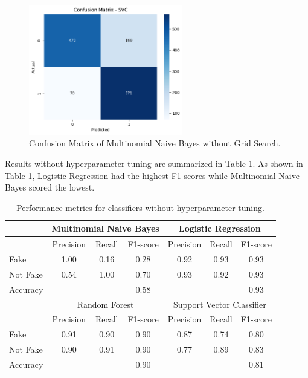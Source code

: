 \begin{figure}[h!]
    \centering
    \includegraphics[width=0.6\textwidth,height=0.6\textheight, keepaspectratio]{figures/hyperparam/SVC_default.png}
        \caption{Confusion Matrix of Multinomial Naive Bayes without Grid Search.}
        \label{SVC_default}
\end{figure}

Results without hyperparameter tuning are summarized in Table \ref{tab:no_hyperparam_summary}. As shown in Table \ref{tab:no_hyperparam_summary}, Logistic Regression had the highest F1-scores while Multinomial Naive Bayes scored the lowest.

\begin{table}[ht]
    \centering
    \begin{tabular}{|l|ccc|ccc|}
    \hline
    & \multicolumn{3}{c|}{Multinomial Naive Bayes} & \multicolumn{3}{c|}{Logistic Regression} \\
    \hline
    & Precision & Recall & F1-score & Precision & Recall & F1-score \\
    \hline
    Fake & 1.00 & 0.16 & 0.28 & 0.92 & 0.93 & 0.93 \\
    Not Fake & 0.54 & 1.00 & 0.70 & 0.93 & 0.92 & 0.93 \\
    Accuracy & & & 0.58 & & & 0.93 \\
    \hline
    & \multicolumn{3}{c|}{Random Forest} & \multicolumn{3}{c|}{Support Vector Classifier} \\
    \hline
    & Precision & Recall & F1-score & Precision & Recall & F1-score \\
    \hline
    Fake & 0.91 & 0.90 & 0.90 & 0.87 & 0.74 & 0.80 \\
    Not Fake & 0.90 & 0.91 & 0.90 & 0.77 & 0.89 & 0.83 \\
    Accuracy & & & 0.90 & & & 0.81 \\
    \hline
    \end{tabular}
    \caption{Performance metrics for classifiers without hyperparameter tuning.}
    \label{tab:no_hyperparam_summary}
\end{table}



